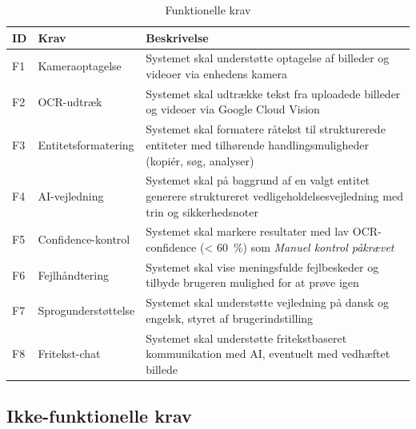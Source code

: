 \begin{table}[H]
  \centering
  \caption{Funktionelle krav}
  \label{tab:funktionelle-krav}
  \begin{tabularx}{\textwidth}{@{}llX@{}}
    \toprule
    \textbf{ID} & \textbf{Krav} & \textbf{Beskrivelse} \\
    \midrule
    F1 & Kameraoptagelse     & Systemet skal understøtte optagelse af billeder og videoer via enhedens kamera \\
    \addlinespace
    F2 & OCR-udtræk          & Systemet skal udtrække tekst fra uploadede billeder og videoer via Google Cloud Vision \\
    \addlinespace
    F3 & Entitetsformatering & Systemet skal formatere råtekst til strukturerede entiteter med tilhørende handlingsmuligheder (kopiér, søg, analyser) \\
    \addlinespace
    F4 & AI-vejledning       & Systemet skal på baggrund af en valgt entitet generere struktureret vedligeholdelsesvejledning med trin og sikkerhedsnoter \\
    \addlinespace
    F5 & Confidence-kontrol  & Systemet skal markere resultater med lav OCR-confidence (< 60~\%) som \textit{Manuel kontrol påkrævet} \\
    \addlinespace
    F6 & Fejlhåndtering      & Systemet skal vise meningsfulde fejlbeskeder og tilbyde brugeren mulighed for at prøve igen \\
    \addlinespace
    F7 & Sprogunderstøttelse & Systemet skal understøtte vejledning på dansk og engelsk, styret af brugerindstilling \\
    \addlinespace
    F8 & Fritekst-chat       & Systemet skal understøtte fritekstbaseret kommunikation med AI, eventuelt med vedhæftet billede \\
    \bottomrule
  \end{tabularx}
\end{table}

\subsection{Ikke-funktionelle krav}
\label{subsec:ikke-funktionelle-krav}

